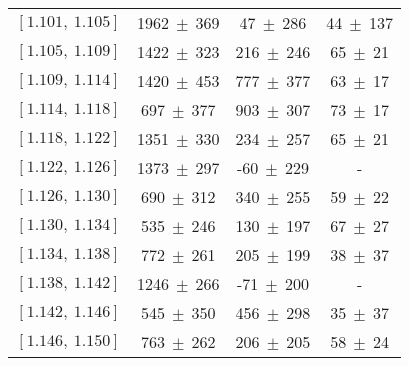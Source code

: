 \documentclass[aps,prd,twocolumn,showpacs,amsmath,amssymb]{revtex4-1}
\begin{document}
\begin{table*}[htbp]
\begin{center}
\begin{tabular}{cccc}
                $[1.101,\ 1.105]$   &	1962$\ \pm\ $369&	47$\ \pm\ $286&	44$\ \pm\ $137 \\ 	
                $[1.105,\ 1.109]$   &	1422$\ \pm\ $323&	216$\ \pm\ $246&	65$\ \pm\ $21 \\ 	
                $[1.109,\ 1.114]$   &	1420$\ \pm\ $453&	777$\ \pm\ $377&	63$\ \pm\ $17 \\ 	
                $[1.114,\ 1.118]$   &	697$\ \pm\ $377&	903$\ \pm\ $307&	73$\ \pm\ $17 \\ 	
                $[1.118,\ 1.122]$   &	1351$\ \pm\ $330&	234$\ \pm\ $257&	65$\ \pm\ $21 \\ 	
                $[1.122,\ 1.126]$   &	1373$\ \pm\ $297&	-60$\ \pm\ $229&	 - \\ 	
                $[1.126,\ 1.130]$   &	690$\ \pm\ $312&	340$\ \pm\ $255&	59$\ \pm\ $22 \\ 	
                $[1.130,\ 1.134]$   &	535$\ \pm\ $246&	130$\ \pm\ $197&	67$\ \pm\ $27 \\ 	
                $[1.134,\ 1.138]$   &	772$\ \pm\ $261&	205$\ \pm\ $199&	38$\ \pm\ $37 \\ 	
                $[1.138,\ 1.142]$   &	1246$\ \pm\ $266&	-71$\ \pm\ $200&	 - \\ 	
                $[1.142,\ 1.146]$   &	545$\ \pm\ $350&	456$\ \pm\ $298&	35$\ \pm\ $37 \\ 	
                $[1.146,\ 1.150]$   &	763$\ \pm\ $262&	206$\ \pm\ $205&	58$\ \pm\ $24 \\ 	
                \hline\hline
            \end{tabular}
        \end{center}
    \end{table*}
\end{document}
